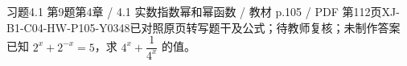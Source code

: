 \par\noindent\begin{minipage}{\linewidth}
\begin{bankitem}{习题4.1 第9题}{第4章 / 4.1 实数指数幂和幂函数 / 教材 p.105 / PDF 第112页}{XJ-B1-C04-HW-P105-Y0348}{已对照原页转写题干及公式；待教师复核；未制作答案}
已知 $2^x+2^{-x}=5$，求 $4^x+\dfrac1{4^x}$ 的值。
\end{bankitem}
\end{minipage}\par\medskip
